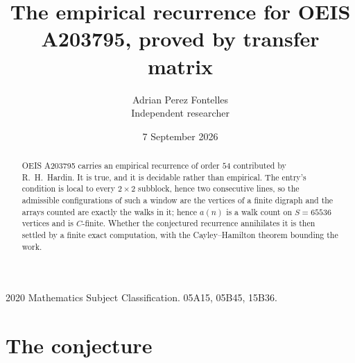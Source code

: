 \documentclass[11pt,a4paper]{article}
\title{The empirical recurrence for OEIS A203795, proved by transfer matrix}
\author{Adrian Perez Fontelles\\ \small Independent researcher}
\date{7 September 2026}
\theoremstyle{plain}
\theoremstyle{definition}
\begin{document}
\maketitle

\begin{abstract}
OEIS A203795 carries an empirical recurrence of order $54$ contributed by R.~H.~Hardin. It is
true, and it is decidable rather than empirical. The entry's condition is local to every $2\times2$ subblock, hence two consecutive lines, so
the admissible configurations of such a window are the vertices of a finite digraph and the
arrays counted are exactly the walks in it; hence $a(n)$ is a walk count on $S=65536$ vertices
and is $C$-finite. Whether the conjectured recurrence annihilates it is then settled by a
finite exact computation, with the Cayley--Hamilton theorem bounding the work.
\end{abstract}

\noindent\small 2020 Mathematics Subject Classification. 05A15, 05B45, 15B36.\normalsize

\section{The conjecture}
\end{document}

